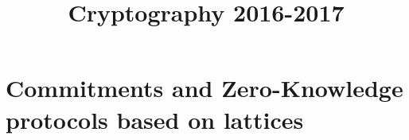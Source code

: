 \documentclass[10pt]{llncs}
\begin{document}
\pagestyle{plain}



\title{Cryptography 2016-2017}

\author{}
 
\institute{}


\maketitle

\section{Commitments and Zero-Knowledge protocols based on lattices}




 
\end{document}
